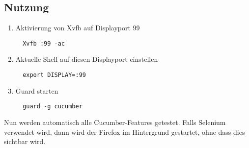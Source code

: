 \subsection*{Nutzung}

\begin{enumerate}
 \item Aktivierung von Xvfb auf Displayport 99
 \begin{verbatim}
  Xvfb :99 -ac
 \end{verbatim}

 \item Aktuelle Shell auf diesen Displayport einstellen
 \begin{verbatim}
  export DISPLAY=:99
 \end{verbatim}

 \item Guard starten
 \begin{verbatim}
  guard -g cucumber
 \end{verbatim}
\end{enumerate}

Nun werden automatisch alle Cucumber-Features getestet. Falls Selenium verwendet wird, dann wird der Firefox im Hintergrund gestartet, ohne dass dies sichtbar wird.



\newpage
\listoffigures

\lstlistoflistings




\renewcommand{\indexname}{Stichwortverzeichnis}
\printindex
